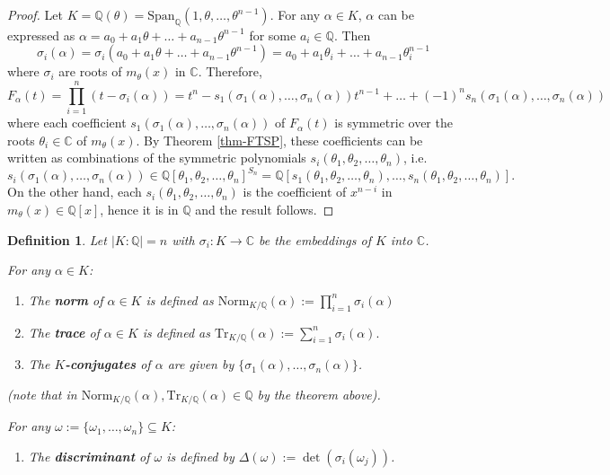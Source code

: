 \documentclass[11pt]{book}
\newtheorem{definition}[theorem]{Definition}
\begin{document}
\begin{proof} Let $K = \mathbb{Q}(\theta) = \mathrm{Span}_{\mathbb{Q}}(1,\theta,\dots,\theta^{n-1})$. For any $\alpha \in K$, $\alpha$ can be expressed as $\alpha = a_0 + a_1\theta + \dots + a_{n-1}\theta^{n-1}$ for some $a_i \in \mathbb{Q}$. Then
\[
\sigma_i(\alpha) = \sigma_i(a_0 + a_1\theta + \dots + a_{n-1}\theta^{n-1}) = a_0 + a_1\theta_i + \dots + a_{n-1}\theta_i^{n-1}
\]
where $\sigma_i$ are roots of $m_{\theta}(x)$ in $\mathbb{C}$.
Therefore,
\[
F_{\alpha}(t) = \prod_{i=1}^n (t - \sigma_i(\alpha))
= t^n - s_1(\sigma_1(\alpha), \dots, \sigma_n(\alpha))t^{n-1} + \dots + (-1)^n s_n(\sigma_1(\alpha), \dots, \sigma_n(\alpha))
\]
where each coefficient $s_1(\sigma_1(\alpha), \dots, \sigma_n(\alpha))$ of $F_{\alpha}(t)$ is symmetric over the roots $\theta_i \in \mathbb{C}$ of $m_{\theta}(x)$. By Theorem \ref{thm-FTSP}, these coefficients can be written as combinations of the symmetric polynomials $s_i(\theta_1, \theta_2, \dots, \theta_n)$, i.e.
$$s_i(\sigma_1(\alpha), \dots, \sigma_n(\alpha)) \in \mathbb{Q}[\theta_1, \theta_2, \dots, \theta_n]^{S_n} = \mathbb{Q}[s_1(\theta_1, \theta_2, \dots, \theta_n), \dots, s_n(\theta_1, \theta_2, \dots, \theta_n)].$$
On the other hand, each $s_i(\theta_1, \theta_2, \dots, \theta_n)$ is the coefficient of $x^{n-i}$ in $m_{\theta}(x) \in \mathbb{Q}[x]$, hence it is in  $\mathbb{Q}$ and the result follows.
\end{proof}

\begin{definition} Let $|K : \mathbb{Q}| = n$ with $\sigma_i: K \to \mathbb{C}$ be the embeddings of $K$ into $\mathbb{C}$. 

\medskip
For any $\alpha \in K$:
\begin{enumerate}
    \item[(a)] The {\bf norm} of $\alpha \in K$ is defined as \(
\text{Norm}_{K/\mathbb{Q}}(\alpha) := \prod_{i=1}^n \sigma_i(\alpha)
\) 
\item[(b)] The {\bf trace} of $\alpha \in K$ is defined as
\(
\text{Tr}_{K/\mathbb{Q}}(\alpha) := \sum_{i=1}^n \sigma_i(\alpha).
\)
    \item[(c)] The {\bf $K$-conjugates} of $\alpha$ are given by $\{\sigma_1(\alpha), \dots, \sigma_n(\alpha)\}$.
\end{enumerate}
(note that in $\text{Norm}_{K/\mathbb{Q}}(\alpha), \text{Tr}_{K/\mathbb{Q}}(\alpha) \in \mathbb{Q}$ by the theorem above).

\medskip
For any $\omega := \{\omega_1, \dots, \omega_n\} \subseteq K$:
\begin{enumerate}
\item[(d)] The {\bf discriminant} of $\omega$ is defined by $\Delta(\omega) := \det(\sigma_i(\omega_j))$. 
\end{enumerate}
\end{definition}
\end{document}
